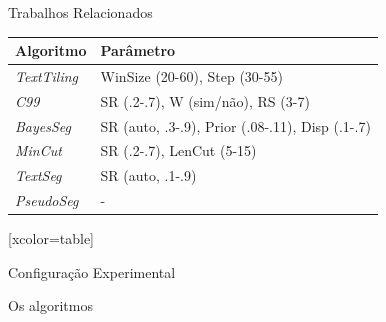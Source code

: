 \begin{frame}{Trabalhos Relacionados}
\begin{figure}[!h]
	\label{fig:c12-q2}
\end{figure}











\begin{table}
\begin{tabular}{l | l }
	Algoritmo & Parâmetro \\
\hline \hline


\textit{TextTiling} & WinSize (20-60), Step (30-55)                    \\ 
\textit{C99} &        SR (.2-.7), W (sim/não), RS (3-7)                           \\ 
\textit{BayesSeg} &   SR (auto, .3-.9), Prior (.08-.11), Disp (.1-.7)         \\ 
\textit{MinCut} &     SR (.2-.7), LenCut (5-15)                             \\ 
\textit{TextSeg} &    SR (auto, .1-.9)                                       \\ 
\textit{PseudoSeg} &  -       \\ 

\end{tabular}
\end{table}






[xcolor=table]
\usepackage[table]{xcolor}

\begin{frame}{Configuração Experimental}

	\nblock{}{
		\begin{itemize}
			\item 
		\end{itemize}
	}
\end{frame}



Os algoritmos 


\begin{columns}
    \begin{column}{0.48\textwidth}
    \end{column}
    \begin{column}{0.48\textwidth}
    \end{column}
\end{columns}





\end{frame}
